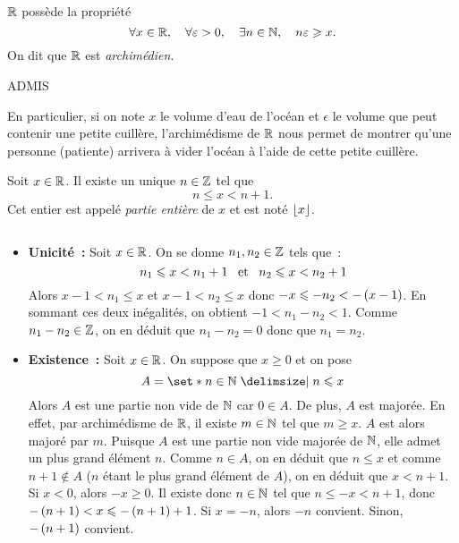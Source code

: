 \documentclass{magnolia}
\begin{document}
\begin{proposition}
$\mathbb{R}$ possède la propriété
\[\forall x\in\mathbb{R} ,\quad \forall \varepsilon>0 ,\quad \exists n\in\mathbb{N} ,\quad n\varepsilon \geqslant x.\]
On dit que $\mathbb{R}$ est \emph{archimédien}.
\end{proposition}

\begin{preuve}
ADMIS

\end{preuve}

\begin{remarqueUnique}
\remarque En particulier, si on note $x$ le volume d'eau de l'océan et $\epsilon$ le volume
que peut contenir une petite cuillère, l'archimédisme de $\mathbb{R}$ nous permet de montrer qu'une
personne (patiente) arrivera à vider l'océan à l'aide de cette petite cuillère.
\end{remarqueUnique}




\begin{definition}[utile=-3]
Soit $x\in\mathbb{R}$. Il existe un unique $n\in\mathbb{Z}$ tel que
\[n\leq x<n+1.\]
Cet entier est appelé \emph{partie entière} de $x$ et est noté $\left\lfloor x\right\rfloor$.
\end{definition}

\begin{preuve}
$\quad$
\begin{itemize}
\item \textbf{Unicité~:}
  Soit $x\in\mathbb{R}$. On se donne $n_1,n_2\in\mathbb{Z}$ tels que~:
  \[n_1\leqslant x<n_1+1 \quad\!\text{et}\quad\! n_2\leqslant x<n_2+1\]
  Alors $x-1<n_1\leq x$ et $x-1<n_2\leq x$ donc $-x\leqslant -n_2<-\left(x-1\right)$. En
  sommant ces deux inégalités, on obtient $-1<n_1-n_2<1$. Comme $n_1-n_2\in\mathbb{Z}$,
  on en déduit que $n_1-n_2=0$ donc que $n_1=n_2$.
\item \textbf{Existence~:}
  Soit $x\in\mathbb{R}$. On suppose que $x\geq 0$ et on pose
  \[A=\enstq{n\in\N}{n\leq x}\]
  Alors $A$ est une partie non vide de $\mathbb{N}$ car $0\in A$. De plus, $A$ est
  majorée.
  En effet, par archimédisme de $\mathbb{R}$, il existe $m\in\mathbb{N}$ tel que $m\geq x$. $A$
  est alors majoré par $m$. Puisque $A$ est une partie non vide majorée de $\mathbb{N}$,
  elle admet un plus grand élément $n$. Comme $n\in A$, on en déduit que
  $n\leq x$ et comme $n+1\not\in A$ ($n$ étant le plus grand élément de $A$), on
  en déduit que $x<n+1$.\\
  Si $x<0$, alors $-x\geq 0$. Il existe donc $n\in\mathbb{N}$ tel que
  $n\leq -x<n+1$, donc $-\left(n+1\right)<x\leqslant -\left(n+1\right)+1$. Si $x=-n$, alors $-n$
  convient. Sinon, $-\left(n+1\right)$ convient.
\end{itemize}
\end{preuve}
\end{document}
